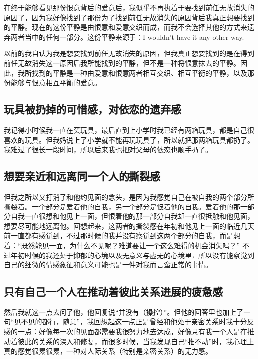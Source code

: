 在终于能够看见那份恨意背后的爱意后，我似乎不再执着于要找到前任无故消失的原因了，因为我好像找到了那份为了找到前任无故消失的原因背后我真正想要找到的平静。现在的这份平静是由恨意和爱意交织而成，而我不会选择其他的方式来遗弃两者当中的任何一部分。这份平静来源于：I  wouldn't have it any other way.

以前的我自认为我是想要找到前任无故消失的原因，但我真正想要找到的是在得到前任无故消失这一原因后我所能找到的平静，但不是一种将恨意抹去的平静。因此，我所找到的平静是一种由爱意和恨意两者相互交织、相互平衡的平静，以及那份能够与恨意相互平衡的爱意。


\subsection*{玩具被扔掉的可惜感，对依恋的遗弃感}

我记得小时候我一直在买玩具，最后直到上小学时我已经有两箱玩具，都是自己很喜欢的玩具。但我妈说上了小学就不能再玩玩具了，所以就把那两箱玩具都扔了。我难过了很长一段时间，所以后来我也把对父母的依恋也顺手扔了。


\subsection*{想要亲近和远离同一个人的撕裂感}

但我之所以又打消了和他约见面的念头，是因为我感觉自己在被自我的两个部分所撕裂着。一个部分是爱着他的自我，另一个部分是恨着他的自我。爱着他的那一部分自我一直很想和他见上一面，但恨着他的那一部分自我却一直很抵触和他见面，想要尽可能地远离他。回想起来，这两者的撕裂感在年初和他见上一面的临近几天前一直都有感觉到，不过那时候的我并没有察觉到这两个部分的自我，而是想着：“既然能见一面，为什么不见呢？难道要让一个这么难得的机会消失吗？” 不过年初时候的我还处于抑郁的心境以及无意义与虚无的心境里，所以没有能察觉到自己的细微的情感象征和意义可能也是一件对我而言蛮正常的事情。


\subsection*{只有自己一个人在推动着彼此关系进展的疲惫感}

然后我就这一点去问了他，他回复说“并没有（操控）”。但他的回答里也加上了一句“见不见的都行，随意”，我回想起这一点正是曾经和他处于亲密关系时我十分反感的一点：好像每一次的见面都需要我很努力地去达成，好像只有我一个人是在推动着彼此的关系的深入和修复，而很多时候，当我发现自己“推不动”时，我心理上真的感觉很累很累，一种对人际关系（特别是亲密关系）的无力感。

